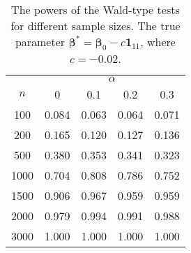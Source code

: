 \documentclass[a4paper]{article}%
\begin{document}
\begin{table}[h]
	\caption{The powers of the Wald-type tests for different sample sizes. The true parameter  $\boldsymbol{\beta}^* = \boldsymbol{\beta}_0 - c \boldsymbol{1}_{11}$, where $c = - 0.02$. }%
	\label{TAB:sim3}
	\centering
	\begin{tabular}
		[c]{|c|cccc|}\hline
		&\multicolumn{4}{c|}{$\alpha$}\\
		$n$  & 0  & 0.1 & 0.2 & 0.3 \\ \hline
		100 & 0.084 & 0.063 & 0.064 & 0.071\\
		200 & 0.165 & 0.120 & 0.127 & 0.136\\
		500 & 0.380 & 0.353 & 0.341 & 0.323\\
		1000 & 0.704 & 0.808 & 0.786 & 0.752\\
		1500 & 0.906 & 0.967 & 0.959 & 0.959\\
		2000 & 0.979 & 0.994 & 0.991 & 0.988\\
		3000 & 1.000 & 1.000 & 1.000 & 1.000
				
		\\\hline
	\end{tabular}
\end{table}
\end{document}
